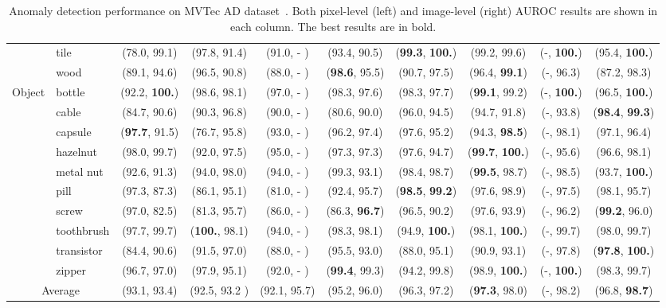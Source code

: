 \begin{table}[!h]
{\begin{tabular}{cl|c|c|c|c|c|c|c|c}
& tile & (78.0, 99.1) & (97.8, 91.4) & (91.0, - ) & (93.4, 90.5) & (\textbf{99.3}, \textbf{100.}) & (99.2, 99.6) & (-, \textbf{100.}) & (95.4, \textbf{100.}) \\
& wood & (89.1, 94.6) & (96.5, 90.8) & (88.0, - ) & (\textbf{98.6}, 95.5) & (90.7, 97.5) & (96.4, \textbf{99.1}) & (-, 96.3) & (87.2, 98.3) \\
\midrule
\multirow{10}{*}{Object} 
& bottle & (92.2, \textbf{100.}) & (98.6, 98.1) & (97.0, - ) & (98.3, 97.6) & (98.3, 97.7) & (\textbf{99.1}, 99.2) & (-, \textbf{100.}) & (96.5, \textbf{100.}) \\
& cable & (84.7, 90.6) & (90.3, 96.8) & (90.0, - ) & (80.6, 90.0) & (96.0, 94.5) & (94.7, 91.8) & (-, 93.8) & (\textbf{98.4}, \textbf{99.3}) \\
& capsule & (\textbf{97.7}, 91.5) & (76.7, 95.8) & (93.0, - ) & (96.2, 97.4) & (97.6, 95.2) & (94.3, \textbf{98.5}) & (-, 98.1) & (97.1, 96.4) \\
& hazelnut & (98.0, 99.7) & (92.0, 97.5) & (95.0, - ) & (97.3, 97.3) & (97.6, 94.7) & (\textbf{99.7}, \textbf{100.}) & (-, 95.6) & (96.6, 98.1) \\
& metal nut & (92.6, 91.3) & (94.0, 98.0) & (94.0, - ) & (99.3, 93.1) & (98.4, 98.7) & (\textbf{99.5}, 98.7) & (-, 98.5) & (93.7, \textbf{100.}) \\
& pill & (97.3, 87.3) & (86.1, 95.1) & (81.0, - ) & (92.4, 95.7) & (\textbf{98.5}, \textbf{99.2}) & (97.6, 98.9) & (-, 97.5) & (98.1, 95.7) \\
& screw & (97.0, 82.5) & (81.3, 95.7) & (86.0, - ) & (86.3, \textbf{96.7}) & (96.5, 90.2) & (97.6, 93.9) & (-, 96.2) & (\textbf{99.2}, 96.0) \\
& toothbrush & (97.7, 99.7) & (\textbf{100.}, 98.1) & (94.0, - ) & (98.3, 98.1) & (94.9, \textbf{100.}) & (98.1, \textbf{100.}) & (-, 99.7) & (98.0, 99.7) \\
& transistor & (84.4, 90.6) & (91.5, 97.0) & (88.0, - ) & (95.5, 93.0) & (88.0, 95.1) & (90.9, 93.1) & (-, 97.8) & (\textbf{97.8}, \textbf{100.}) \\
& zipper & (96.7, 97.0) & (97.9, 95.1) & (92.0, - ) & (\textbf{99.4}, 99.3) & (94.2, 99.8) & (98.9, \textbf{100.}) & (-, \textbf{100.}) & (98.3, 99.7) \\
\midrule
\multicolumn{2}{c|}{Average} & (93.1, 93.4) & (92.5, 93.2 ) & (92.1, 95.7) & (95.2, 96.0) & (96.3, 97.2) & (\textbf{97.3}, 98.0) & (-, 98.2) & (96.8, \textbf{98.7}) \\
\bottomrule
\end{tabular}}
\caption{Anomaly detection performance on MVTec AD dataset~\cite{MVTecAD}. Both pixel-level (left) and image-level (right) AUROC results are shown in each column. The best results are in bold.}
\label{tab: mvtec_main_detail}
\end{table}

